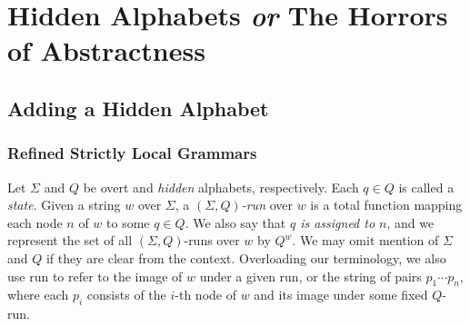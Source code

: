 \chapter{\texorpdfstring{Hidden Alphabets \emph{or} The Horrors of Abstractness}{Hidden Alphabets or The Horrors of Abstractness}}
\label{cha:REG}

\section{Adding a Hidden Alphabet}

\subsection{Refined Strictly Local Grammars}

\begin{definition}[Run]
    Let $\Sigma$ and $Q$ be overt and \emph{hidden} alphabets, respectively.
    Each $q \in Q$ is called a \emph{state}.
    Given a string $w$ over $\Sigma$, a \emph{$(\Sigma,Q)$-run} over $w$ is a total function mapping each node $n$ of $w$ to some $q \in Q$.
    We also say that \emph{$q$ is assigned to $n$}, and we represent the set of all $(\Sigma,Q)$-runs over $w$ by $Q^w$.
    We may omit mention of $\Sigma$ and $Q$ if they are clear from the context.
    Overloading our terminology, we also use run to refer to the image of $w$ under a given run, or the string of pairs $p_1 \cdots p_n$, where each $p_i$ consists of the $i$-th node of $w$ and its image under some fixed $Q$-run.
\end{definition}
%
